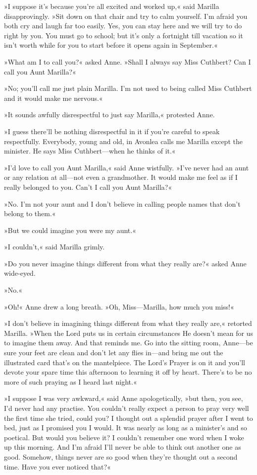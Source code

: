 »I suppose it’s because you’re all excited and worked up,« said Marilla disapprovingly. »Sit down on that chair and try to calm yourself. I’m afraid you both cry and laugh far too easily. Yes, you can stay here and we will try to do right by you. You must go to school; but it’s only a fortnight till vacation so it isn’t worth while for you to start before it opens again in September.«

»What am I to call you?« asked Anne. »Shall I always say Miss Cuthbert? Can I call you Aunt Marilla?«

»No; you’ll call me just plain Marilla. I’m not used to being called Miss Cuthbert and it would make me nervous.«

»It sounds awfully disrespectful to just say Marilla,« protested Anne.

»I guess there’ll be nothing disrespectful in it if you’re careful to speak respectfully. Everybody, young and old, in Avonlea calls me Marilla except the minister. He says Miss Cuthbert—when he thinks of it.«

»I’d love to call you Aunt Marilla,« said Anne wistfully. »I’ve never had an aunt or any relation at all—not even a grandmother. It would make me feel as if I really belonged to you. Can’t I call you Aunt Marilla?«

»No. I’m not your aunt and I don’t believe in calling people names that don’t belong to them.«

»But we could imagine you were my aunt.«

»I couldn’t,« said Marilla grimly.

»Do you never imagine things different from what they really are?« asked Anne wide-eyed.

»No.«

»Oh!« Anne drew a long breath. »Oh, Miss—Marilla, how much you miss!«

»I don’t believe in imagining things different from what they really are,« retorted Marilla. »When the Lord puts us in certain circumstances He doesn’t mean for us to imagine them away. And that reminds me. Go into the sitting room, Anne—be sure your feet are clean and don’t let any flies in—and bring me out the illustrated card that’s on the mantelpiece. The Lord’s Prayer is on it and you’ll devote your spare time this afternoon to learning it off by heart. There’s to be no more of such praying as I heard last night.«

»I suppose I was very awkward,« said Anne apologetically, »but then, you see, I’d never had any practise. You couldn’t really expect a person to pray very well the first time she tried, could you? I thought out a splendid prayer after I went to bed, just as I promised you I would. It was nearly as long as a minister’s and so poetical. But would you believe it? I couldn’t remember one word when I woke up this morning. And I’m afraid I’ll never be able to think out another one as good. Somehow, things never are so good when they’re thought out a second time. Have you ever noticed that?«


